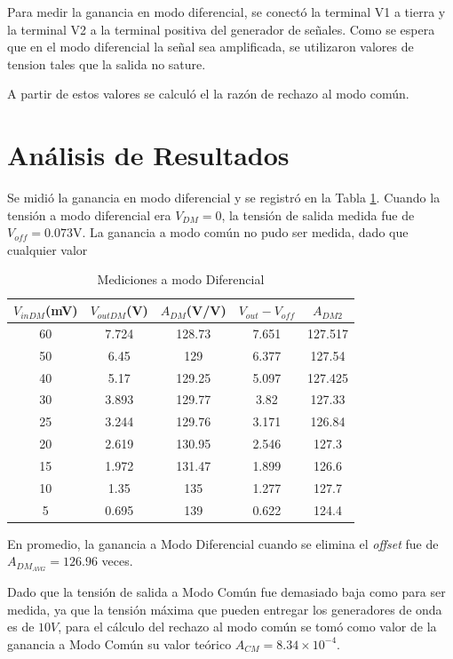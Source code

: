 Para medir la ganancia en modo diferencial, se conectó la terminal V1 a tierra y la terminal V2 a la terminal positiva del generador de señales.
Como se espera que en el modo diferencial la señal sea amplificada, se utilizaron valores de tension tales que la salida no sature.

A partir de estos valores se calculó el la razón de rechazo al modo común.

\section{Análisis de Resultados}

Se midió la ganancia en modo diferencial y se registró en la Tabla \ref{e4:tab_vdm}.
Cuando la tensión a modo diferencial era $V_{DM}=0$, la tensión de salida medida fue de $V_{off}=0.073\si{\volt}$. La ganancia a modo común no pudo ser medida, dado que cualquier valor

\begin{table}[ht]
\begin{center}
\begin{tabular}{||c|c|c|c|c||}
\hline
$V_{in DM}$(mV)&$V_{out DM}$(V)&$A_{DM}$(V/V)&$V_{out}-V_{off}$&$A_{DM2}$\\
\hline
60	&7.724	&128.73	&7.651	&127.517	\\
50	&6.45	&129		&6.377	&127.54	\\
40	&5.17	&129.25	&5.097	&127.425	\\
30	&3.893	&129.77	&3.82	&127.33	\\
25	&3.244	&129.76	&3.171	&126.84	\\
20	&2.619	&130.95	&2.546	&127.3	\\
15	&1.972	&131.47	&1.899	&126.6	\\
10	&1.35	&135		&1.277	&127.7	\\
5	&0.695	&139		&0.622	&124.4	\\
\hline
\end{tabular}
\caption{Mediciones a modo Diferencial}
\label{e4:tab_vdm}
\end{center}
\end{table}

En promedio, la ganancia a Modo Diferencial cuando se elimina el \textit{offset} fue de $A_{DM_{AVG}}=126.96$ veces.

Dado que la tensión de salida a Modo Común fue demasiado baja como para ser medida, ya que la tensión máxima que pueden entregar los generadores de onda es de $10V$, para el cálculo del rechazo al modo común se tomó como valor de la ganancia a Modo Común su valor teórico $A_{CM}=8.34\times 10^{-4}$.

